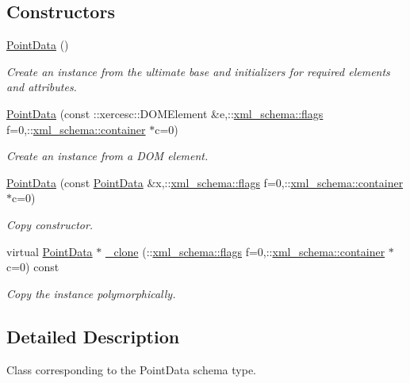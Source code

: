\subsection*{Constructors}
\begin{DoxyCompactItemize}
\item 
\hyperlink{classPointData_add74ef42ae2c48850449cd59e216111f}{Point\-Data} ()
\begin{DoxyCompactList}\small\item\em Create an instance from the ultimate base and initializers for required elements and attributes. \end{DoxyCompactList}\item 
\hyperlink{classPointData_ae0d2a9251b2690a28a04a96105874e45}{Point\-Data} (const \-::xercesc\-::\-D\-O\-M\-Element \&e,\-::\hyperlink{namespacexml__schema_a0612287d030cb2732d31a45b258fdc87}{xml\-\_\-schema\-::flags} f=0,\-::\hyperlink{namespacexml__schema_ada9aa30dc722e93ee2ed7243085402a5}{xml\-\_\-schema\-::container} $\ast$c=0)
\begin{DoxyCompactList}\small\item\em Create an instance from a D\-O\-M element. \end{DoxyCompactList}\item 
\hyperlink{classPointData_a552557267dd3178a8e76be436b0709bc}{Point\-Data} (const \hyperlink{classPointData}{Point\-Data} \&x,\-::\hyperlink{namespacexml__schema_a0612287d030cb2732d31a45b258fdc87}{xml\-\_\-schema\-::flags} f=0,\-::\hyperlink{namespacexml__schema_ada9aa30dc722e93ee2ed7243085402a5}{xml\-\_\-schema\-::container} $\ast$c=0)
\begin{DoxyCompactList}\small\item\em Copy constructor. \end{DoxyCompactList}\item 
virtual \hyperlink{classPointData}{Point\-Data} $\ast$ \hyperlink{classPointData_aeb33ffedc35f8abc9ffd0d2f053c68ac}{\-\_\-clone} (\-::\hyperlink{namespacexml__schema_a0612287d030cb2732d31a45b258fdc87}{xml\-\_\-schema\-::flags} f=0,\-::\hyperlink{namespacexml__schema_ada9aa30dc722e93ee2ed7243085402a5}{xml\-\_\-schema\-::container} $\ast$c=0) const 
\begin{DoxyCompactList}\small\item\em Copy the instance polymorphically. \end{DoxyCompactList}\end{DoxyCompactItemize}


\subsection{Detailed Description}
Class corresponding to the Point\-Data schema type. 

